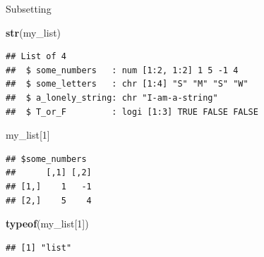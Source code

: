 \documentclass[ignorenonframetext,]{beamer}
\newenvironment{Shaded}{\begin{snugshade}}{\end{snugshade}}
\newcommand{\DecValTok}[1]{\textcolor[rgb]{0.00,0.00,0.81}{#1}}
\newcommand{\KeywordTok}[1]{\textcolor[rgb]{0.13,0.29,0.53}{\textbf{#1}}}
\newcommand{\NormalTok}[1]{#1}
\begin{document}
\begin{frame}[fragile]{Subsetting}
\protect\hypertarget{subsetting-1}{}

\begin{Shaded}
\begin{Highlighting}[]
\KeywordTok{str}\NormalTok{(my_list)}
\end{Highlighting}
\end{Shaded}

\begin{verbatim}
## List of 4
##  $ some_numbers   : num [1:2, 1:2] 1 5 -1 4
##  $ some_letters   : chr [1:4] "S" "M" "S" "W"
##  $ a_lonely_string: chr "I-am-a-string"
##  $ T_or_F         : logi [1:3] TRUE FALSE FALSE
\end{verbatim}

\begin{Shaded}
\begin{Highlighting}[]
\NormalTok{my_list[}\DecValTok{1}\NormalTok{] }
\end{Highlighting}
\end{Shaded}

\begin{verbatim}
## $some_numbers
##      [,1] [,2]
## [1,]    1   -1
## [2,]    5    4
\end{verbatim}

\begin{Shaded}
\begin{Highlighting}[]
\KeywordTok{typeof}\NormalTok{(my_list[}\DecValTok{1}\NormalTok{])}
\end{Highlighting}
\end{Shaded}

\begin{verbatim}
## [1] "list"
\end{verbatim}

\end{frame}
\end{document}
